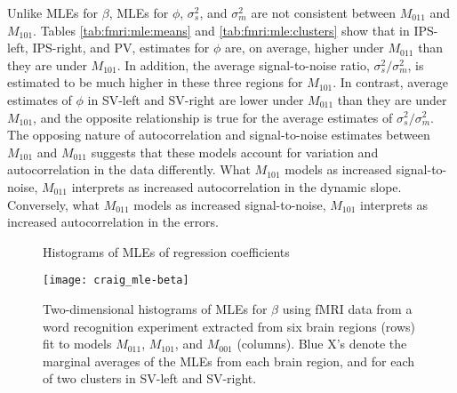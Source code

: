 Unlike MLEs for $\beta$, MLEs for $\phi$, $\sigma^2_s$, and $\sigma^2_m$ are not consistent between $M_{011}$ and $M_{101}$. Tables \ref{tab:fmri:mle:means} and \ref{tab:fmri:mle:clusters} show that in IPS-left, IPS-right, and PV, estimates for $\phi$ are, on average, higher under $M_{011}$ than they are under $M_{101}$.  In addition, the average signal-to-noise ratio, $\sigma^2_s / \sigma^2_m$, is estimated to be much higher in these three regions for $M_{101}$. In contrast, average estimates of $\phi$ in SV-left and SV-right are lower under $M_{011}$ than they are under $M_{101}$, and the opposite relationship is true for the average estimates of $\sigma^2_s / \sigma^2_m$. The opposing nature of autocorrelation and signal-to-noise estimates between $M_{101}$ and $M_{011}$ suggests that these models account for variation and autocorrelation in the data differently. What $M_{101}$ models as increased signal-to-noise, $M_{011}$ interprets as increased autocorrelation in the dynamic slope. Conversely, what $M_{011}$ models as increased signal-to-noise, $M_{101}$ interprets as increased autocorrelation in the errors.


\begin{figure}
\ssp
\centering
\caption{Histograms of MLEs of regression coefficients} \label{fig:fmri:mle:beta}
\texttt{[image: craig\_mle-beta]}
\caption*{Two-dimensional histograms of MLEs for $\beta$ using fMRI data from a word recognition experiment extracted from six brain regions (rows) fit to models $M_{011}$, $M_{101}$, and $M_{001}$ (columns). Blue X's denote the marginal averages of the MLEs from each brain region, and for each of two clusters in SV-left and SV-right.}
\end{figure}

